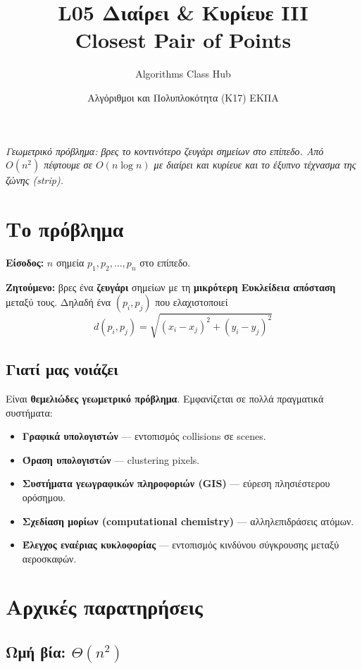 \documentclass[11pt,a4paper]{article}
\title{\textbf{L05 \textperiodcentered{} Διαίρει \& Κυρίευε III}\\[2pt]
\large Closest Pair of Points}
\author{Algorithms Class Hub}
\date{\small Αλγόριθμοι και Πολυπλοκότητα (K17) \textperiodcentered{} ΕΚΠΑ}
\begin{document}
\maketitle

\begin{center}\itshape\small
Γεωμετρικό πρόβλημα: βρες το κοντινότερο ζευγάρι σημείων στο επίπεδο. Από
$O(n^2)$ πέφτουμε σε $O(n \log n)$ με διαίρει και κυρίευε και το έξυπνο τέχνασμα
της ζώνης (strip).
\end{center}

\section{Το πρόβλημα}

\textbf{Είσοδος:} $n$ σημεία $p_1, p_2, \dots, p_n$ στο επίπεδο.

\textbf{Ζητούμενο:} βρες ένα \textbf{ζευγάρι} σημείων με τη \textbf{μικρότερη
Ευκλείδεια απόσταση} μεταξύ τους. Δηλαδή ένα $(p_i, p_j)$ που ελαχιστοποιεί
\[
d(p_i, p_j) = \sqrt{(x_i - x_j)^2 + (y_i - y_j)^2}
\]

\subsection{Γιατί μας νοιάζει}

Είναι \textbf{θεμελιώδες γεωμετρικό πρόβλημα}. Εμφανίζεται σε πολλά πραγματικά
συστήματα:
\begin{itemize}
  \item \textbf{Γραφικά υπολογιστών} --- εντοπισμός collisions σε scenes.
  \item \textbf{Όραση υπολογιστών} --- clustering pixels.
  \item \textbf{Συστήματα γεωγραφικών πληροφοριών (GIS)} --- εύρεση πλησιέστερου
  ορόσημου.
  \item \textbf{Σχεδίαση μορίων (computational chemistry)} --- αλληλεπιδράσεις
  ατόμων.
  \item \textbf{Έλεγχος εναέριας κυκλοφορίας} --- εντοπισμός κινδύνου σύγκρουσης
  μεταξύ αεροσκαφών.
\end{itemize}

\section{Αρχικές παρατηρήσεις}

\subsection{Ωμή βία: $\Theta(n^2)$}
\end{document}
